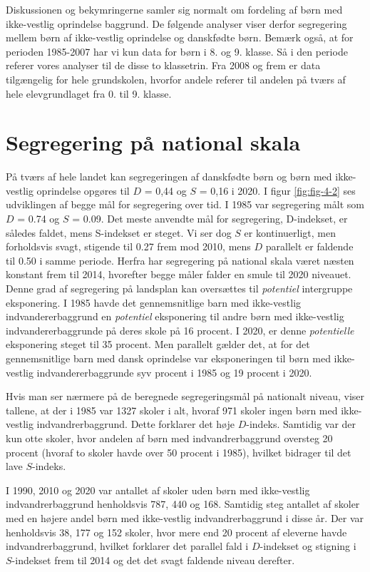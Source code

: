 \documentclass[
]{book}
\begin{document}
Diskussionen og bekymringerne samler sig normalt om fordeling af børn med ikke-vestlig oprindelse baggrund. De følgende analyser viser derfor segregering mellem børn af ikke-vestlig oprindelse og danskfødte børn. Bemærk også, at for perioden 1985-2007 har vi kun data for børn i 8. og 9. klasse. Så i den periode referer vores analyser til de disse to klassetrin. Fra 2008 og frem er data tilgængelig for hele grundskolen, hvorfor andele referer til andelen på tværs af hele elevgrundlaget fra 0. til 9. klasse.

\section{Segregering på national skala}\label{segregering-puxe5-national-skala}

På tværs af hele landet kan segregeringen af danskfødte børn og børn med ikke-vestlig oprindelse opgøres til \(D\) = 0,44 og \(S\) = 0,16 i 2020. I figur \ref{fig:fig-4-2} ses udviklingen af begge mål for segregering over tid. I 1985 var segregering målt som \(D\) = 0.74 og \(S\) = 0.09. Det meste anvendte mål for segregering, D-indekset, er således faldet, mens S-indekset er steget. Vi ser dog \(S\) er kontinuerligt, men forholdsvis svagt, stigende til 0.27 frem mod 2010, mens \(D\) parallelt er faldende til 0.50 i samme periode. Herfra har segregering på national skala været næsten konstant frem til 2014, hvorefter begge måler falder en smule til 2020 niveauet. Denne grad af segregering på landsplan kan oversættes til \emph{potentiel} intergruppe eksponering. I 1985 havde det gennemsnitlige barn med ikke-vestlig indvandererbaggrund en \emph{potentiel} eksponering til andre børn med ikke-vestlig indvandererbaggrunde på deres skole på 16 procent. I 2020, er denne \emph{potentielle} eksponering steget til 35 procent. Men parallelt gælder det, at for det gennemsnitlige barn med dansk oprindelse var eksponeringen til børn med ikke-vestlig indvandererbaggrunde syv procent i 1985 og 19 procent i 2020.

Hvis man ser nærmere på de beregnede segregeringsmål på nationalt niveau, viser tallene, at der i 1985 var 1327 skoler i alt, hvoraf 971 skoler ingen børn med ikke-vestlig indvandrerbaggrund. Dette forklarer det høje \(D\)-indeks. Samtidig var der kun otte skoler, hvor andelen af børn med indvandrerbaggrund oversteg 20 procent (hvoraf to skoler havde over 50 procent i 1985), hvilket bidrager til det lave \(S\)-indeks.

I 1990, 2010 og 2020 var antallet af skoler uden børn med ikke-vestlig indvandrerbaggrund henholdsvis 787, 440 og 168. Samtidig steg antallet af skoler med en højere andel børn med ikke-vestlig indvandrerbaggrund i disse år. Der var henholdsvis 38, 177 og 152 skoler, hvor mere end 20 procent af eleverne havde indvandrerbaggrund, hvilket forklarer det parallel fald i \(D\)-indekset og stigning i \(S\)-indekset frem til 2014 og det det svagt faldende niveau derefter.
\end{document}
